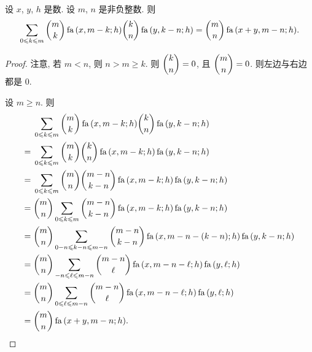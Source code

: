 \documentclass[../libro.tex]{subfiles}
\begin{document}
\begin{theorem}
    设 \(x\), \(y\), \(h\) 是数.
    设 \(m\), \(n\) 是非负整数.
    则
    \begin{align*}
        \sum_{0 \leq k \leq m}
        {\dbinom{m}{k} \operatorname{fa} {(x, m - k; h)}
        \dbinom{k}{n} \operatorname{fa} {(y, k - n; h)}}
        = \dbinom{m}{n} \operatorname{fa} {(x + y, m - n; h)}.
    \end{align*}
\end{theorem}

\begin{proof}
    注意, 若 \(m < n\), 则 \(n > m \geq k\).
    则 \(\dbinom{k}{n} = 0\),
    且 \(\dbinom{m}{n} = 0\).
    则左边与右边都是 \(0\).

    设 \(m \geq n\).
    则
    \begin{align*}
        &
        \sum_{0 \leq k \leq m}
        {\dbinom{m}{k} \operatorname{fa} {(x, m - k; h)}
        \dbinom{k}{n} \operatorname{fa} {(y, k - n; h)}}
        \\
        = {} &
        \sum_{0 \leq k \leq m}
        {\dbinom{m}{k} \dbinom{k}{n}
            \operatorname{fa} {(x, m - k; h)}
        \operatorname{fa} {(y, k - n; h)}}
        \\
        = {} &
        \sum_{0 \leq k \leq m}
        {\dbinom{m}{n} \dbinom{m-n}{k-n}
            \operatorname{fa} {(x, m - k; h)}
        \operatorname{fa} {(y, k - n; h)}}
        \\
        = {} &
        \dbinom{m}{n}
        \sum_{0 \leq k \leq m}
        {\dbinom{m-n}{k-n}
            \operatorname{fa} {(x, m - k; h)}
        \operatorname{fa} {(y, k - n; h)}}
        \\
        = {} &
        \dbinom{m}{n}
        \sum_{0-n \leq k-n \leq m-n}
        {\dbinom{m-n}{k-n}
            \operatorname{fa} {(x, m - n - (k - n); h)}
        \operatorname{fa} {(y, k - n; h)}}
        \\
        = {} &
        \dbinom{m}{n}
        \sum_{-n \leq \ell \leq m-n}
        {\dbinom{m-n}{\ell}
            \operatorname{fa} {(x, m - n - \ell; h)}
        \operatorname{fa} {(y, \ell; h)}}
        \\
        = {} &
        \dbinom{m}{n}
        \sum_{0 \leq \ell \leq m-n}
        {\dbinom{m-n}{\ell}
            \operatorname{fa} {(x, m - n - \ell; h)}
        \operatorname{fa} {(y, \ell; h)}}
        \\
        = {} &
        \dbinom{m}{n}
        \operatorname{fa} {(x + y, m - n; h)}.
        \qedhere
    \end{align*}
\end{proof}
\end{document}
